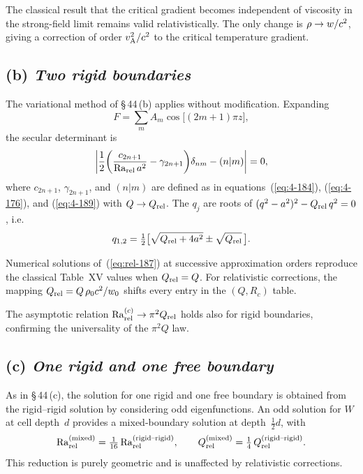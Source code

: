 \begin{relcorrection}
The classical result that the critical gradient becomes independent
of viscosity in the strong-field limit remains valid
relativistically.  The only change is $\rho\to w/c^{2}$,
giving a correction of order $v_{\mathrm{A}}^{2}/c^{2}$ to the critical
temperature gradient.
\end{relcorrection}

\subsection*{(b) \emph{Two rigid boundaries}}

The variational method of \S\,44\,(b) applies without modification.
Expanding
\[
  F = \sum_{m}A_{m}\cos\bigl[(2m+1)\pi z\bigr],
\]
the secular determinant is
\begin{equation}\label{eq:rel-187}
  \biggl|\frac{1}{2}
    \biggl(\frac{c_{2n+1}}{\mathrm{Ra}_{\mathrm{rel}}\,a^{2}}-\gamma_{2n+1}\biggr)
    \delta_{nm}-(n|m)\biggr| = 0,
\end{equation}
where $c_{2n+1}$, $\gamma_{2n+1}$, and $(n|m)$ are defined
as in equations~(\ref{eq:4-184}), (\ref{eq:4-176}), and
(\ref{eq:4-189}) with $Q\to Q_{\mathrm{rel}}$.  The $q_{j}$ are roots of
$(q^{2}-a^{2})^{2}-Q_{\mathrm{rel}}\,q^{2}=0$, i.e.\
\begin{equation}\label{eq:rel-178}
  q_{1,2}
  = \tfrac{1}{2}\bigl[\sqrt{Q_{\mathrm{rel}}+4a^{2}}\pm\sqrt{Q_{\mathrm{rel}}}\,\bigr].
\end{equation}

Numerical solutions of~(\ref{eq:rel-187}) at successive
approximation orders reproduce the classical Table~XV values when
$Q_{\mathrm{rel}}=Q$.  For relativistic corrections, the mapping
$Q_{\mathrm{rel}} = Q\,\rho_0 c^{2}/w_{0}$ shifts every entry
in the $(Q,R_{c})$ table.

The asymptotic relation $\mathrm{Ra}_{\mathrm{rel}}^{(c)}\to\pi^{2}Q_{\mathrm{rel}}$ holds also
for rigid boundaries, confirming the universality of the $\pi^{2}Q$
law.

\subsection*{(c) \emph{One rigid and one free boundary}}

As in \S\,44\,(c), the solution for one rigid and one free boundary
is obtained from the rigid--rigid solution by considering odd
eigenfunctions.  An odd solution for $W$ at cell depth~$d$ provides
a mixed-boundary solution at depth~$\tfrac{1}{2}d$, with
\[
  \mathrm{Ra}_{\mathrm{rel}}^{\text{(mixed)}}
  = \tfrac{1}{16}\,\mathrm{Ra}_{\mathrm{rel}}^{\text{(rigid--rigid)}},\qquad
  Q_{\mathrm{rel}}^{\text{(mixed)}}
  = \tfrac{1}{4}\,Q_{\mathrm{rel}}^{\text{(rigid--rigid)}}.
\]
This reduction is purely geometric and is unaffected by
relativistic corrections.


